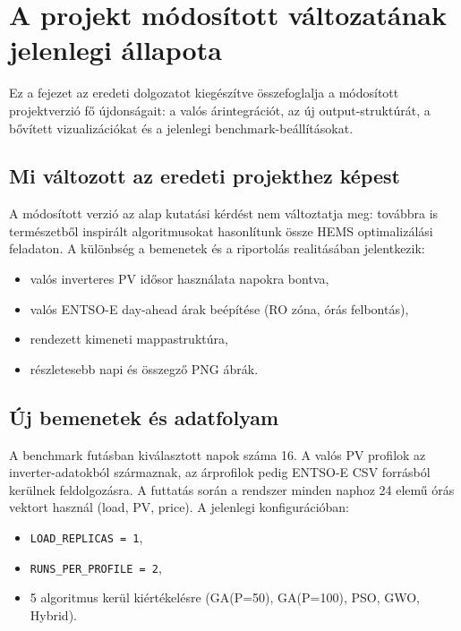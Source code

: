 \chapter{A projekt módosított változatának jelenlegi állapota}\label{ch:FRISSITES}

\begin{osszefoglal}
Ez a fejezet az eredeti dolgozatot kiegészítve összefoglalja a módosított projektverzió fő újdonságait: a valós árintegrációt, az új output-struktúrát, a bővített vizualizációkat és a jelenlegi benchmark-beállításokat.
\end{osszefoglal}

\section{Mi változott az eredeti projekthez képest}
A módosított verzió az alap kutatási kérdést nem változtatja meg: továbbra is természetből inspirált algoritmusokat hasonlítunk össze HEMS optimalizálási feladaton. A különbség a bemenetek és a riportolás realitásában jelentkezik:
\begin{itemize}
  \item valós inverteres PV idősor használata napokra bontva,
  \item valós ENTSO-E day-ahead árak beépítése (RO zóna, órás felbontás),
  \item rendezett kimeneti mappastruktúra,
  \item részletesebb napi és összegző PNG ábrák.
\end{itemize}

\section{Új bemenetek és adatfolyam}
A benchmark futásban kiválasztott napok száma 16. A valós PV profilok az inverter-adatokból származnak, az árprofilok pedig ENTSO-E CSV forrásból kerülnek feldolgozásra. A futtatás során a rendszer minden naphoz 24 elemű órás vektort használ (load, PV, price). A jelenlegi konfigurációban:
\begin{itemize}
  \item \texttt{LOAD\_REPLICAS = 1},
  \item \texttt{RUNS\_PER\_PROFILE = 2},
  \item 5 algoritmus kerül kiértékelésre (GA(P=50), GA(P=100), PSO, GWO, Hybrid).
\end{itemize}

